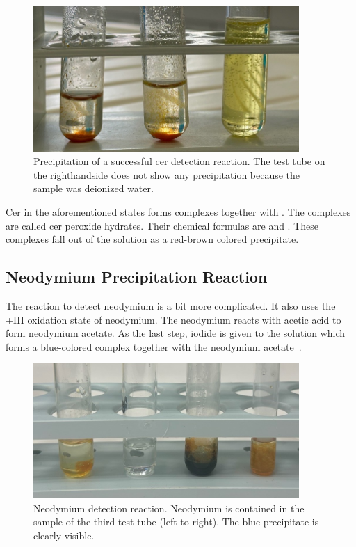 \begin{figure}[H]
    \centering
    \includegraphics[width=0.9\textwidth]{./media/images/ree_precipitation_reaction_cropped}
    \caption{Precipitation of a successful cer detection reaction. The test tube on the righthandside does not show any precipitation because the sample was deionized water.}
    \label{fig:cer_precipitation_cropped1}
\end{figure}

Cer in the aforementioned states forms complexes together with .
The complexes are called cer peroxide hydrates.
Their chemical formulas are  and .
These complexes fall out of the solution as a red-brown colored precipitate.

\subsection{Neodymium Precipitation Reaction}
The reaction to detect neodymium is a bit more complicated.
It also uses the +III oxidation state of neodymium.
The neodymium reacts with acetic acid to form neodymium acetate.
As the last step, iodide is given to the solution which forms a blue-colored complex together with the neodymium acetate~\cite{janderblasius}.

\begin{figure}[H]
    \centering
    \includegraphics[width=0.9\textwidth]{./media/images/nd_precipitation_reaction_cropped}
    \caption{Neodymium detection reaction. Neodymium is contained in the sample of the third test tube (left to right). The blue precipitate is clearly visible.}
    \label{fig:nd_precipitation}
\end{figure}

